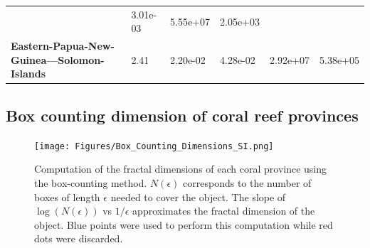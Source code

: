 \begin{table}[H]
{\begin{tabular}{llllll}
                                                                & 3.01e-03
                                                                & 5.55e+07
                                                                & 2.05e+03
            \\
            \textbf{Eastern-Papua-New-Guinea---Solomon-Islands} & 2.41
                                                                & 2.20e-02
                                                                &
            4.28e-02                                            & 2.92e+07
                                                                & 5.38e+05
            \\
            \hline
        \end{tabular}%
    }
\end{table}

\subsection{Box counting dimension of coral reef provinces}

\begin{figure}[H]
    \centering

    \texttt{[image: Figures/Box\_Counting\_Dimensions\_SI.png]}
    \caption{Computation of the fractal dimensions of each coral province
        using the box-counting method. $N(\epsilon)$ corresponds to the number
        of boxes
        of length $\epsilon$ needed to cover the object. The slope of
        $\log(N(\epsilon))$ vs $1/\epsilon$ approximates the fractal dimension
        of the
        object. Blue points were used to perform this computation while red
        dots were
        discarded.}
    \label{fig:Box_Counting_SI}
\end{figure}
